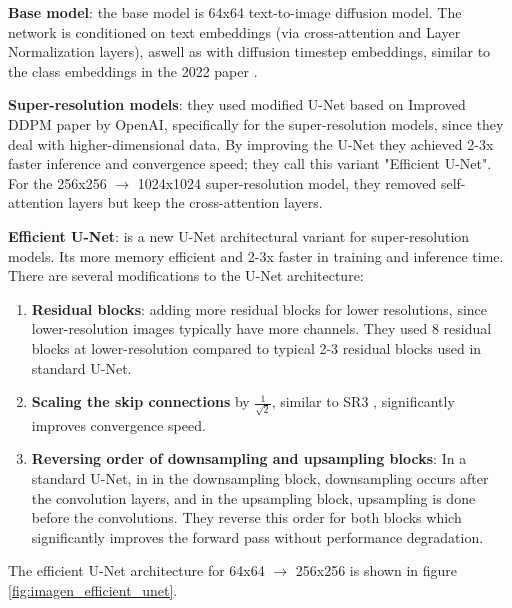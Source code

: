 \textbf{Base model}: the base model is 64x64 text-to-image diffusion model. The network is conditioned on text embeddings (via cross-attention and Layer Normalization layers), aswell as with diffusion timestep embeddings, similar to the class embeddings in the 2022 paper \cite{cascaded_diffusion_models}. 

\textbf{Super-resolution models}: they used modified U-Net based on Improved DDPM paper \cite{openai_improved_ddpm} by OpenAI, specifically for the super-resolution models, since they deal with higher-dimensional data. By improving the U-Net they achieved 2-3x faster inference and convergence speed; they call this variant "Efficient U-Net". For the 256x256 $\rightarrow$ 1024x1024 super-resolution model, they removed self-attention layers but keep the cross-attention layers.

\textbf{Efficient U-Net}: is a new U-Net architectural variant for super-resolution models. Its more memory efficient and 2-3x faster in training and inference time. There are several modifications to the U-Net architecture:

\begin{enumerate}
    \item \textbf{Residual blocks}: adding more residual blocks for lower resolutions, since lower-resolution images typically have more channels. They used 8 residual blocks at lower-resolution compared to typical 2-3 residual blocks used in standard U-Net.
    \item \textbf{Scaling the skip connections} by $\frac{1}{\sqrt{2}}$, similar to SR3 \cite{sr3}, significantly improves convergence speed.
    \item \textbf{Reversing order of downsampling and upsampling blocks}: In a standard U-Net, in in the downsampling block, downsampling occurs after the convolution layers, and in the upsampling block, upsampling is done before the convolutions. They reverse this order for both blocks which significantly improves the forward pass without performance degradation.
\end{enumerate}

The efficient U-Net architecture for 64x64 $\rightarrow$ 256x256 is shown in figure \ref{fig:imagen_efficient_unet}.

